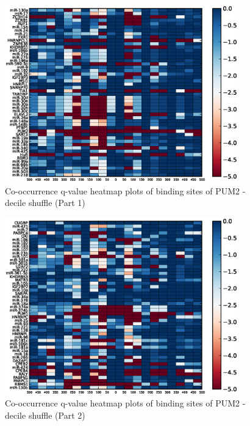 \begin{figure}
   	\includegraphics[width=0.9\textwidth]{appendix1/figures/PUM2_decile_expressed_heatmap_qvalues0.eps}
   	\caption{Co-occurrence q-value heatmap plots of binding sites of PUM2 - decile shuffle (Part 1)}
\end{figure}
\clearpage
\begin{figure}
   	\includegraphics[width=0.9\textwidth]{appendix1/figures/PUM2_decile_expressed_heatmap_qvalues1.eps}
   	\caption{Co-occurrence q-value heatmap plots of binding sites of PUM2 - decile shuffle (Part 2)}
\end{figure}

